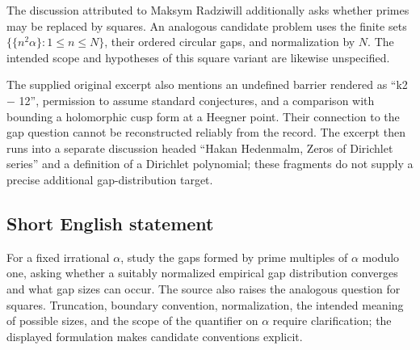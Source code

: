 \documentclass[11pt]{article}
\begin{document}
The discussion attributed to Maksym Radziwill additionally asks whether primes may be replaced by squares. An analogous candidate problem uses the finite sets \(\{\{n^2\alpha\}:1\leq n\leq N\}\), their ordered circular gaps, and normalization by \(N\). The intended scope and hypotheses of this square variant are likewise unspecified.

The supplied original excerpt also mentions an undefined barrier rendered as ``k2 \(-\) 12'', permission to assume standard conjectures, and a comparison with bounding a holomorphic cusp form at a Heegner point. Their connection to the gap question cannot be reconstructed reliably from the record. The excerpt then runs into a separate discussion headed ``Hakan Hedenmalm, Zeros of Dirichlet series'' and a definition of a Dirichlet polynomial; these fragments do not supply a precise additional gap-distribution target.
\subsection{Short English statement}
For a fixed irrational \(\alpha\), study the gaps formed by prime multiples of \(\alpha\) modulo one, asking whether a suitably normalized empirical gap distribution converges and what gap sizes can occur. The source also raises the analogous question for squares. Truncation, boundary convention, normalization, the intended meaning of possible sizes, and the scope of the quantifier on \(\alpha\) require clarification; the displayed formulation makes candidate conventions explicit.
\end{document}
